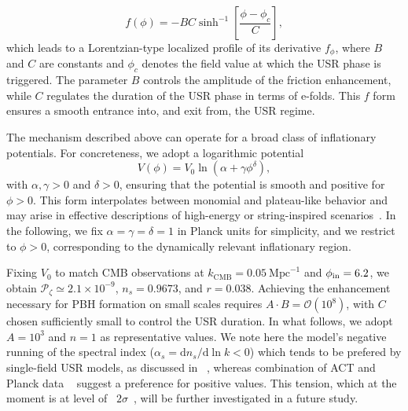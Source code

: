\documentclass[nofootinbib,aps,a4paper,letterpaper,superscriptaddress,
twocolumn,times]{revtex4}
\renewcommand{\(}{\left(}
\renewcommand{\)}{\right)}
\renewcommand{\(}{\left(}
\renewcommand{\)}{\right)}
\renewcommand{\[}{\left[}
\renewcommand{\]}{\right]}
\newcommand{\TP}[1]{{\color{blue}\ TP: #1} }
\begin{document}
\begin{equation}
f(\phi) = -
B C \sinh^{-1}\left[ \frac{\phi-\phi_c}{C} \right],
\end{equation}
which leads to a Lorentzian-type localized profile of its derivative $f_{\phi}$, where  $B$ and $C$ are constants and $\phi_c$ denotes the field value at which 
the USR phase is triggered. The parameter $B$ controls the amplitude of the 
friction enhancement, while $C$ regulates the duration of the USR phase in 
terms of e-folds. This $f$ form  ensures a smooth entrance into, and exit from, the 
USR regime.

The mechanism described above can operate for a broad class of inflationary 
potentials. For concreteness, we adopt a logarithmic potential
\begin{equation}
V(\phi) = V_0 \ln(\alpha + \gamma \phi^\delta),
\end{equation}
with $\alpha, \gamma>0$ and $\delta>0$, ensuring that the potential is smooth 
and positive for $\phi>0$. This form interpolates between monomial and 
plateau-like behavior and may arise in effective descriptions of high-energy or 
string-inspired scenarios~\cite{Baumann:2014nda,Ballesteros:2015noa,Dalianis:2018frf}. In the following, we fix $\alpha=\gamma=\delta=1$ in 
Planck units for simplicity, and we restrict to $\phi>0$, corresponding to the 
dynamically relevant inflationary region. 

Fixing $V_0$ to match CMB observations at 
$k_{\text{CMB}} = 0.05~\mathrm{Mpc}^{-1}$ and $\phi_{\rm in}=6.2$, we obtain 
$\mathcal{P}_\zeta \simeq 2.1\times 10^{-9}$, $n_s=0.9673$, and $r=0.038$. 
Achieving the enhancement necessary for PBH formation on small scales requires 
$A\cdot B = \mathcal{O}(10^8)$, with $C$ chosen sufficiently small to control 
the USR duration. In what follows, we adopt $A=10^3$ and $n=1$ as 
representative values. We note here the model's negative running of the spectral index ($\alpha_s=
\mathrm{d}n_s/\mathrm{d}\ln k<0$) which tends to be prefered by single-field USR models, as discussed in ~\cite{Allegrini:2025jha}, whereas combination of ACT and Planck data ~\cite{Aiola:2020azj} suggest a preference for positive values. This tension, which at the moment is at level of~ $2\sigma$~\cite{Allegrini:2025jha}, will be further investigated in a future study.
\end{document}
